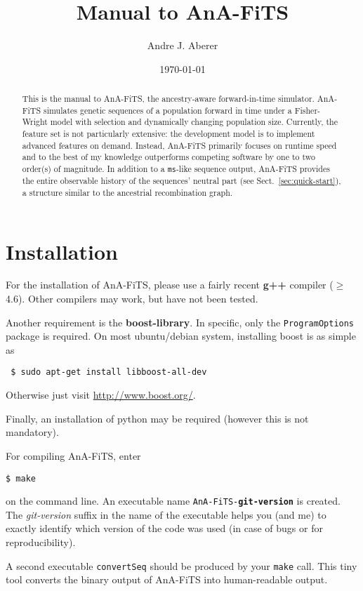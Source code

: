 \documentclass{scrartcl}
\title{Manual to AnA-FiTS}
\author{Andre J. Aberer}
\date{\today}
\begin{document}
\maketitle

\begin{abstract}
  This is the manual to AnA-FiTS, the ancestry-aware forward-in-time
  simulator.  AnA-FiTS simulates genetic sequences of a population
  forward in time under a Fisher-Wright model with selection and
  dynamically changing population size. Currently, the feature set is
  not particularly extensive: the development model is to implement
  advanced features on demand. Instead, AnA-FiTS primarily focuses on
  runtime speed and to the best of my knowledge outperforms competing
  software by one to two order(s) of magnitude. In addition to a
  \texttt{ms}-like sequence output, AnA-FiTS provides the entire
  observable history of the sequences' neutral part (see
  Sect.~\ref{sec:quick-start}), a structure similar to the ancestrial
  recombination graph. 
\end{abstract}

\section{Installation}
\label{sec:installation}

For the installation of AnA-FiTS, please use a fairly recent \textbf{g++}
compiler ($\geq$ 4.6). Other compilers may work, but have not been
tested. 

Another requirement is the \textbf{boost-library}. In specific, only
the \texttt{ProgramOptions} package is required. On most ubuntu/debian
system, installing boost is as simple as 

\texttt{ \$  sudo apt-get install  libboost-all-dev }

\noindent Otherwise just visit \url{http://www.boost.org/}. 


\noindent Finally, an installation of python may be required (however this is
not mandatory). 


\noindent For compiling AnA-FiTS, enter 

\texttt{\$ make} 

\noindent on the command line.  An executable name
\texttt{AnA-FiTS-\textbf{git-version}} is created. The
\textit{git-version} suffix in the name of the executable helps you
(and me) to exactly identify which version of the code was used (in
case of bugs or for reproducibility).

A second executable \texttt{convertSeq} should be produced by your
\texttt{make} call. This tiny tool converts the binary output of AnA-FiTS into
human-readable output. 
\end{document}
